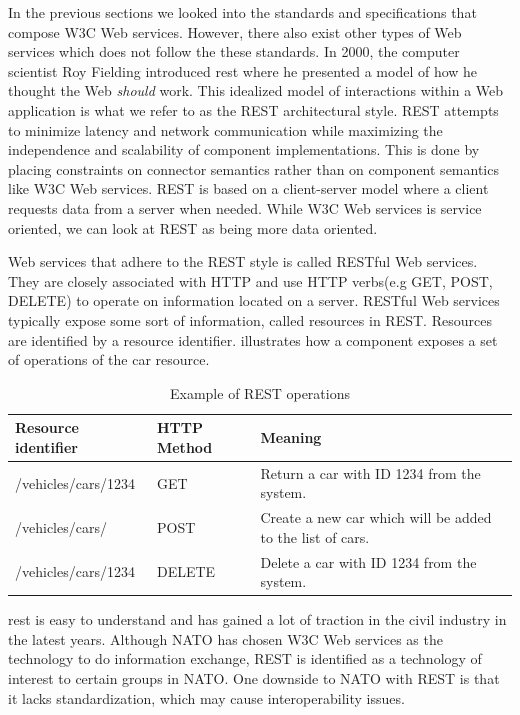 In the previous sections we looked into the standards and specifications that
compose W3C Web services. However, there also exist other types of Web services
which does not follow the these standards. In 2000, the computer scientist Roy
Fielding introduced \gls{rest} where he presented a model of how he thought the
Web \textit{should} work. This idealized model of interactions within a Web
application\cite{rest-fielding} is what we refer to as the REST architectural
style. REST attempts to minimize latency and network communication while
maximizing the independence and scalability of component implementations. This
is done by placing constraints on connector semantics rather than on component
semantics like W3C Web services.  REST is based on a client-server model where a
client requests data from a server when needed. While W3C Web services is
service oriented, we can look at REST as being more data oriented.

Web services that adhere to the REST style is called RESTful Web services. They
are closely associated with HTTP and use HTTP verbs(e.g GET, POST, DELETE) to
operate on information located on a server. RESTful Web services typically
expose some sort of information, called resources in REST. Resources are
identified by a resource identifier.  illustrates how a
component exposes a set of operations of the car resource.

 \begin{table}[h]
 \begin{tabularx}{\textwidth}{| X | X | X |}
 \hline
   \textbf{Resource identifier} & \textbf{HTTP Method}  & \textbf{Meaning}\\ \hline
   /vehicles/cars/1234 & GET & Return a car with ID 1234 from the system. \\ \hline
   /vehicles/cars/ & POST & Create a new car which will be added to the list of cars. \\ \hline
   /vehicles/cars/1234 & DELETE & Delete a car with ID 1234 from the system. \\ \hline
 \end{tabularx}
 \caption{Example of REST operations}
 \label{table-rest}
 \end{table}

 \gls{rest} is easy to understand and has gained a lot of traction in the civil
 industry in the latest years. Although NATO has chosen W3C Web services as the
 technology to do information exchange, REST is identified as a technology of
 interest to certain groups in
 NATO\cite{johnsen-bloebaum-recommendations-web-services-tactical-domain}. One
 downside to NATO with REST is that it lacks standardization, which may cause
 interoperability issues.


